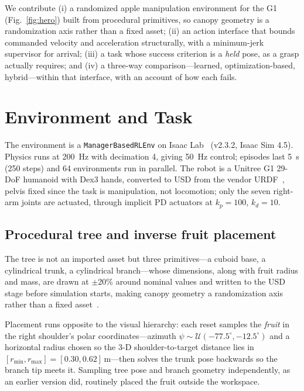 \documentclass[conference]{IEEEtran}
\begin{document}
We contribute (i) a randomized apple manipulation environment for the G1
(Fig.~\ref{fig:hero}) built from procedural primitives, so canopy geometry is a
randomization axis rather than a fixed asset; (ii) an action interface that
bounds commanded velocity and acceleration structurally, with a minimum-jerk
supervisor for arrival; (iii) a task whose success criterion is a \emph{held}
pose, as a grasp actually requires; and (iv) a three-way comparison---learned,
optimization-based, hybrid---within that interface, with an account of how each
fails.

\section{Environment and Task}
\label{sec:env}

The environment is a \texttt{ManagerBasedRLEnv} on Isaac
Lab~\cite{mittal2023orbit} (v2.3.2, Isaac Sim 4.5). Physics runs at
\SI{200}{\hertz} with decimation 4, giving \SI{50}{\hertz} control; episodes last
\SI{5}{\second} (250 steps) and 64 environments run in parallel. The robot is a
Unitree G1 29-DoF humanoid with Dex3 hands, converted to USD from the vendor
URDF~\cite{unitree_ros}, pelvis fixed since the task is manipulation, not
locomotion; only the seven right-arm joints are actuated, through implicit PD
actuators at $k_p=100$, $k_d=10$.

\subsection{Procedural tree and inverse fruit placement}

The tree is not an imported asset but three primitives---a cuboid base, a
cylindrical trunk, a cylindrical branch---whose dimensions, along with fruit
radius and mass, are drawn at $\pm20\%$ around nominal values and written to the
USD stage before simulation starts, making canopy geometry a randomization
axis rather than a fixed
asset~\cite{shakerimov2023domainrand,ahsen2025domainrand}.

Placement runs opposite to the visual hierarchy: each reset samples the
\emph{fruit} in the right shoulder's polar coordinates---azimuth
$\psi\sim\mathcal{U}(-77.5^\circ,-12.5^\circ)$ and a horizontal radius chosen so
the 3-D shoulder-to-target distance lies in $[r_{\min},r_{\max}] =
[0.30,0.62]$\,m---then solves the trunk pose backwards so the branch tip meets
it. Sampling tree pose and branch geometry independently, as an earlier
version did, routinely placed the fruit outside the workspace.
\end{document}
